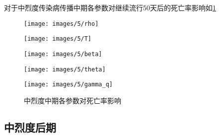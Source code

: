 \documentclass[withoutpreface,bwprint]{cumcmthesis}
\begin{document}
对于中烈度传染病传播中期各参数对继续流行50天后的死亡率影响如\cref{fig:10}
\begin{figure}[H]
    \centering
    \begin{minipage}[c]{0.3\textwidth}
        \centering
        \texttt{[image: images/5/rho]}
        \subcaption{$\rho$}
    \end{minipage}
    \begin{minipage}[c]{0.3\textwidth}
        \centering
        \texttt{[image: images/5/T]}
    \end{minipage}
    \begin{minipage}[c]{0.3\textwidth}
        \centering
        \texttt{[image: images/5/beta]}
        \subcaption{$\beta$}
    \end{minipage}

    \begin{minipage}[c]{0.3\textwidth}
        \centering
        \texttt{[image: images/5/theta]}
        \subcaption{$\theta$}
    \end{minipage}
    \begin{minipage}[c]{0.3\textwidth}
        \centering
        \texttt{[image: images/5/gamma\_q]}
    \end{minipage}
    \caption{中烈度中期各参数对死亡率影响}
    \label{fig:10}
    
\end{figure}

\subsection{中烈度后期}
\end{document}
